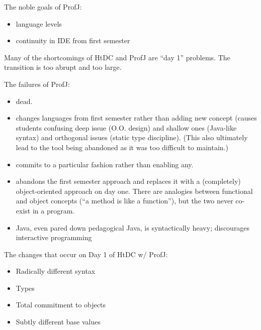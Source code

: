 \documentclass[submission,copyright]{eptcs}
\begin{document}
\cite{dvanhorn:Allen2002DrJava, dvanhorn:Hsia2005Taming}

\cite{dvanhorn:Kolling2003}

\cite{dvanhorn:Bruce2001Library}

\cite{dvanhorn:Alphonce2003Using}

\cite{dvanhorn:Chakravarty2004Risks}

\cite{dvanhorn:Ragde2008Chilling}

\cite{dvanhorn:Bloch2000Scheme}

The noble goals of ProfJ:

\begin{itemize}
\item language levels
\item continuity in IDE from first semester
\end{itemize}

Many of the shortcomings of HtDC and ProfJ are ``day 1'' problems.
The transition is too abrupt and too large.

The failures of  ProfJ:

\begin{itemize}
\item dead.
\item changes languages from first semester rather than adding new
  concept (causes students confusing deep issue (O.O. design) and
  shallow ones (Java-like syntax) and orthogonal issues (static type
  discipline).  (This also ultimately lead to the tool being abandoned
  as it was too difficult to maintain.)

\item commits to a particular fashion rather than enabling any.

\item abandons the first semester approach and replaces it with a
  (completely) object-oriented approach on day one.  There are
  analogies between functional and object concepts (``a method is like
  a function''), but the two never co-exist in a program.

\item Java, even pared down pedagogical Java, is syntactically heavy; discourages
  interactive programming

\end{itemize}

The changes that occur on Day 1 of HtDC w/ ProfJ:

\begin{itemize}
\item Radically different syntax
\item Types
\item Total commitment to objects
\item Subtly different base values
\end{itemize}
\end{document}
